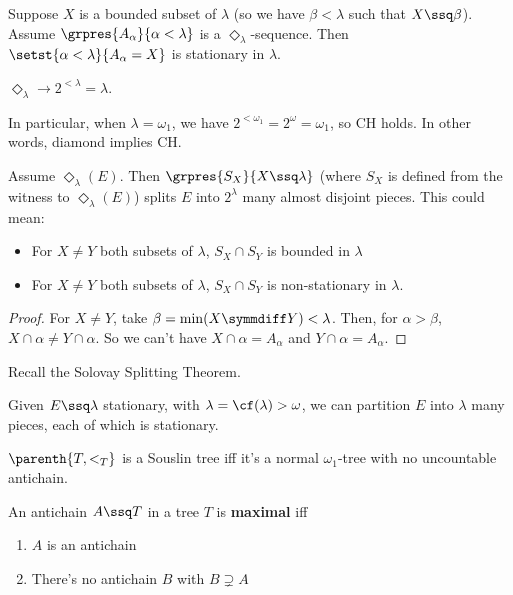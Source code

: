\begin{boxlemma}
    Suppose $X$ is a bounded subset of $\lambda$ (so we have $\beta < \lambda$ such that $X \ssq \beta$). Assume $\grpres{A_{\alpha}}{\alpha < \lambda}$ is a $\Diamond_{\lambda}$-sequence. Then $\setst{\alpha < \lambda}{A_{\alpha} = X}$ is stationary in $\lambda$.
\end{boxlemma}

\begin{boxcorollary}
    $\Diamond_{\lambda} \to 2^{<\lambda} = \lambda$.
\end{boxcorollary}

In particular, when $\lambda = \omega_1$, we have $2^{< \omega_1} = 2^{\omega} = \omega_1$, so CH holds. In other words, diamond implies CH.

\begin{boxlemma}
    Assume $\Diamond_{\lambda}(E)$. Then $\grpres{S_X}{X \ssq \lambda}$ (where $S_X$ is defined from the witness to $\Diamond_{\lambda}(E)$) splits $E$ into $2^{\lambda}$ many almost disjoint pieces. This could mean:
    \begin{itemize}
        \item For $X \neq Y$ both subsets of $\lambda$, $S_X \cap S_Y$ is bounded in $\lambda$
        \item For $X \neq Y$ both subsets of $\lambda$, $S_X \cap S_Y$ is non-stationary in $\lambda$.
    \end{itemize}
\end{boxlemma}
\begin{proof}
    For $X \neq Y$, take $\beta = \min(X \symmdiff Y) < \lambda$. Then, for $\alpha > \beta$, $X \cap \alpha \neq Y \cap \alpha$. So we can't have $X \cap \alpha = A_{\alpha}$ and $Y \cap \alpha  = A_{\alpha}$.
\end{proof}

Recall the Solovay Splitting Theorem.

\begin{boxtheorem}
    Given $E \ssq \lambda$ stationary, with $\lambda = \cf(\lambda) > \omega$, we can partition $E$ into $\lambda$ many pieces, each of which is stationary.
\end{boxtheorem}

\begin{boxlemma}
    $\parenth{T, <_{T}}$ is a Souslin tree iff it's a normal $\omega_1$-tree with no uncountable antichain.
\end{boxlemma}

\begin{boxdefinition}
    An antichain $A \ssq T$ in a tree $T$ is \textbf{maximal} iff
    \begin{enumerate}
        \item $A$ is an antichain
        \item There's no antichain $B$ with $B \supsetneq A$
    \end{enumerate}
\end{boxdefinition}

